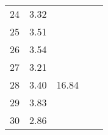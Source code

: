 \begin{center}
\begin{tabular}{| l || c | c | c | c |}
24 & \multirow{1}{*}{ 3.32 }  & & & \\\cline{2-2}
25 & \multirow{1}{*}{ 3.51 }  & & & \\\cline{2-2}\cline{3-3}
26 & \multirow{1}{*}{ 3.54 }  & \multirow{5}{*}{ 16.84 }  & & \\\cline{2-2}
27 & \multirow{1}{*}{ 3.21 }  & & & \\\cline{2-2}
28 & \multirow{1}{*}{ 3.40 }  & & & \\\cline{2-2}
29 & \multirow{1}{*}{ 3.83 }  & & & \\\cline{2-2}
30 & \multirow{1}{*}{ 2.86 }  & & & \\\cline{2-2}\cline{3-3}\cline{4-4}\cline{5-5}
\hline\end{tabular}
\end{center}